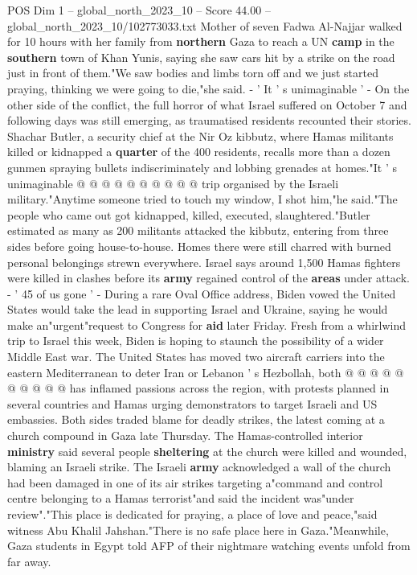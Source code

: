 \begin{textsample}{POS Dim 1 – global\_north\_2023\_10 – Score 44.00 – global\_north\_2023\_10/102773033.txt}
Mother of seven Fadwa Al-Najjar walked for 10 hours with her family from \textbf{northern} Gaza to reach a UN \textbf{camp} in the \textbf{southern} town of Khan Yunis, saying she saw cars hit by a strike on the road just in front of them."We saw bodies and limbs torn off and we just started praying, thinking we were going to die,"she said. - ' It ' s unimaginable ' - On the other side of the conflict, the full horror of what Israel suffered on October 7 and following days was still emerging, as traumatised residents recounted their stories.
Shachar Butler, a security chief at the Nir Oz kibbutz, where Hamas militants killed or kidnapped a \textbf{quarter} of the 400 residents, recalls more than a dozen gunmen spraying bullets indiscriminately and lobbing grenades at homes."It ' s unimaginable @ @ @ @ @ @ @ @ @ @ trip organised by the Israeli military."Anytime someone tried to touch my window, I shot him,"he said."The people who came out got kidnapped, killed, executed, slaughtered."Butler estimated as many as 200 militants attacked the kibbutz, entering from three sides before going house-to-house.
Homes there were still charred with burned personal belongings strewn everywhere.
Israel says around 1,500 Hamas fighters were killed in clashes before its \textbf{army} regained control of the \textbf{areas} under attack. - ' 45 of us gone ' - During a rare Oval Office address, Biden vowed the United States would take the lead in supporting Israel and Ukraine, saying he would make an"urgent"request to Congress for \textbf{aid} later Friday.
Fresh from a whirlwind trip to Israel this week, Biden is hoping to staunch the possibility of a wider Middle East war.
The United States has moved two aircraft carriers into the eastern Mediterranean to deter Iran or Lebanon ' s Hezbollah, both @ @ @ @ @ @ @ @ @ @ has inflamed passions across the region, with protests planned in several countries and Hamas urging demonstrators to target Israeli and US embassies.
Both sides traded blame for deadly strikes, the latest coming at a church compound in Gaza late Thursday.
The Hamas-controlled interior \textbf{ministry} said several people \textbf{sheltering} at the church were killed and wounded, blaming an Israeli strike.
The Israeli \textbf{army} acknowledged a wall of the church had been damaged in one of its air strikes targeting a"command and control centre belonging to a Hamas terrorist"and said the incident was"under review"."This place is dedicated for praying, a place of love and peace,"said witness Abu Khalil Jahshan."There is no safe place here in Gaza."Meanwhile, Gaza students in Egypt told AFP of their nightmare watching events unfold from far away.

\end{textsample}
